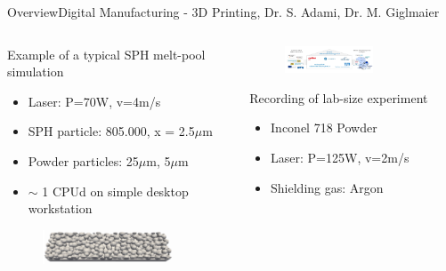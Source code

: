 \documentclass[AERbeamer%
              ,optEnglish%
              ,optBiber%
              ,optBibstyleAlphabetic%
              ,optBeamerClassicFormat%
              ]{AERlatex}%
\begin{document}
\begin{frame}[c]{Overview}{Digital Manufacturing - 3D Printing, Dr. S. Adami, Dr. M. Giglmaier}
    \centering
    \begin{columns}[T]
        \begin{column}{0.48\textwidth}
            Example of a typical SPH melt-pool simulation
            \begin{itemize}
                \item Laser: P=70W, v=4m/s
                \item SPH particle: 805.000, x = 2.5$\mu$m
                \item Powder particles: 25$\mu$m, 5$\mu$m
                \item $\sim$ 1 CPUd on simple desktop workstation 
            \end{itemize}
            \begin{figure}
                \centering
                \includegraphics[width=0.85\textwidth]{3DPrinting1.png}
            \end{figure}
        \end{column}
        \begin{column}{0.48\textwidth}
            \begin{figure}
                \centering
                \includegraphics[width=0.65\textwidth]{3DPrintingCluster.png}
            \end{figure}
            Recording of lab-size experiment
            \begin{itemize}
                \item Inconel 718 Powder
                \item Laser: P=125W, v=2m/s
                \item Shielding gas: Argon

\end{itemize}
\end{column}
\end{columns}
\end{frame}
\end{document}

